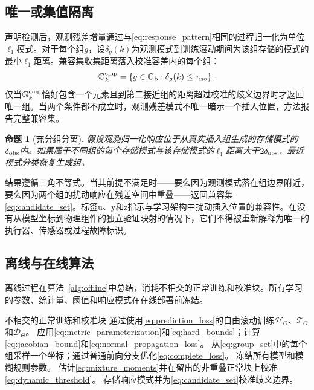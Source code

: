 \documentclass[journal]{IEEEtran}
\newtheorem{proposition}{命题}
\newcommand{\1}{\bm 1}
\begin{document}
\subsection{唯一或集值隔离}
声明检测后，观测残差增量通过与\eqref{eq:response_pattern}相同的过程归一化为单位$\ell_1$模式。对于每个组$g$，设$\delta_g(k)$为观测模式到训练滚动期间为该组存储的模式的最小$\ell_1$距离。兼容集收集距离落入校准容差内的每个组：
\begin{equation}
\mathbb G_k^{\rm cmp}=
\left\{g\in\mathbb G_{\rm b}:
\delta_g(k)\leq\tau_{\rm iso}\right\}.
\label{eq:candidate_set}
\end{equation}
仅当$\mathbb G_k^{\rm cmp}$恰好包含一个元素且到第二接近组的距离超过校准的歧义边界时才返回唯一组。当两个条件都不成立时，观测残差模式不唯一暗示一个插入位置，方法报告完整兼容集。

\begin{proposition}[充分组分离]
\label{prop:isolation}
假设观测归一化响应位于从真实插入组生成的存储模式的$\delta_{\rm obs}$内。如果属于不同组的每个存储模式与该存储模式的$\ell_1$距离大于$2\delta_{\rm obs}$，最近模式分类恢复生成组。
\end{proposition}

结果遵循三角不等式。当其前提不满足时——要么因为观测模式落在组边界附近，要么因为两个组的扰动响应在残差空间中重叠——返回兼容集\eqref{eq:candidate_set}。标签$\mathrm u$、$\mathrm y$和$\mathrm z$指示与学习架构中扰动插入位置的兼容性。在没有从模型坐标到物理组件的独立验证映射的情况下，它们不得被重新解释为唯一的执行器、传感器或过程故障标识。

\subsection{离线与在线算法}
离线过程在算法~\ref{alg:offline}中总结，消耗不相交的正常训练和校准块。所有学习的参数、统计量、阈值和响应模式在在线部署前冻结。

\begin{algorithm}[H]
\caption{正常数据离线设计}
\label{alg:offline}
\begin{algorithmic}[1]
\Require 不相交的正常训练和校准块
\State 通过使用\eqref{eq:prediction_loss}的自由滚动训练$\mathcal H_\Theta$、$\mathcal T_\Theta$和$\mathcal D_\Theta$。
\State 应用\eqref{eq:metric_parameterization}和\eqref{eq:hard_bounds}；计算\eqref{eq:jacobian_bound}和\eqref{eq:normal_propagation_loss}。
\State 从\eqref{eq:group_set}中的每个组采样一个坐标；通过普通前向分支优化\eqref{eq:complete_loss}。
\State 冻结所有模型和模糊规则参数。
\State 估计\eqref{eq:mixture_moments}并在留出的非重叠正常块上校准\eqref{eq:dynamic_threshold}。
\State 存储响应模式并为\eqref{eq:candidate_set}校准歧义边界。
\end{algorithmic}
\end{algorithm}
\end{document}
